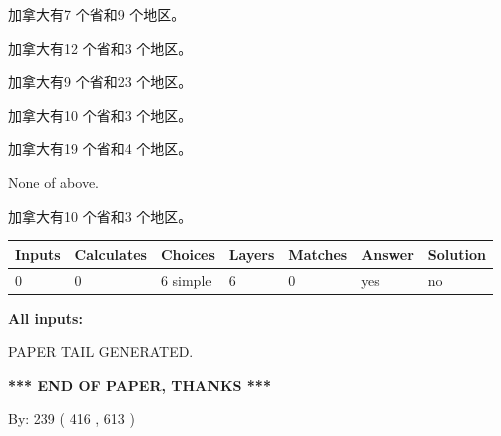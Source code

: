\documentclass{ctexart}
\begin{document}
 
加拿大有7 个省和9 个地区。
 
 
加拿大有12 个省和3 个地区。
 
 
加拿大有9 个省和23 个地区。
 
 
加拿大有10 个省和3 个地区。
 
 
加拿大有19 个省和4 个地区。
 
 
 None of above.
 
 
\noindent{}
 
 
加拿大有10 个省和3 个地区。
 
 
\noindent{}
 
 
   
   
   
   
\noindent\begin{tabular}{|l|l|l|l|l|l|l|}
 \hline
Inputs & Calculates & Choices & Layers & Matches & Answer & Solution \\ \hline
 0  & 
 0  & 
 6
  simple  
  & 
 6  & 
 0  & 
  yes & 
  no 
  \\ \hline
 \end{tabular}
   
   
   
   
\noindent{}
   
   
   
   
\noindent\vspace{0.1in}\hspace{-0.08in} {\textbf{\Large{All inputs: }}}
   
   
   
   
   
   
 \vspace{0.2in}
 
   
   
\vspace{2.0in} PAPER TAIL GENERATED.
   
   
   
   
\vspace{1.0in} 
{\textbf{\large{ *** END OF PAPER, THANKS *** }}} 
   
   
\hspace{1.0in} By: 
 239 ( 416 ,  613 )
   
\end{document}
